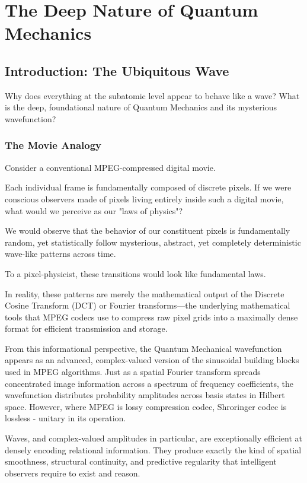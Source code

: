 \chapter{The Deep Nature of Quantum Mechanics}
\label{chap:qm-as-compression}

\section{Introduction: The Ubiquitous Wave}

Why does everything at the subatomic level appear to behave like a wave?
What is the deep, foundational nature of Quantum Mechanics and its mysterious wavefunction? 


\subsection*{The Movie Analogy}

Consider a conventional MPEG-compressed digital movie.

Each individual frame is fundamentally composed of discrete pixels.
If we were conscious observers made of pixels living entirely inside such a digital movie, what would we perceive as our "laws of physics"?

We would observe that the behavior of our constituent pixels is fundamentally random, yet statistically follow mysterious, abstract, yet completely deterministic wave-like patterns across time.

To a pixel-physicist, these transitions would look like fundamental laws.

In reality, these patterns are merely the mathematical output of the Discrete Cosine Transform (DCT) or Fourier transforms—the underlying mathematical tools that 
MPEG codecs use to compress raw pixel grids into a maximally dense format for efficient transmission and storage.

From this informational perspective, the Quantum Mechanical wavefunction appears as an advanced, complex-valued version of the sinusoidal building blocks used in  MPEG algorithms.
Just as a spatial Fourier transform spreads concentrated image information across a spectrum of frequency coefficients, the wavefunction distributes probability amplitudes across basis states in Hilbert space.
However, where MPEG is lossy compression codec, Shroringer codec is lossless - unitary in its operation.

Waves, and complex-valued amplitudes in particular, are exceptionally efficient at densely encoding relational information.
They produce exactly the kind of spatial smoothness, structural continuity, and predictive regularity that intelligent observers require to exist and reason.


